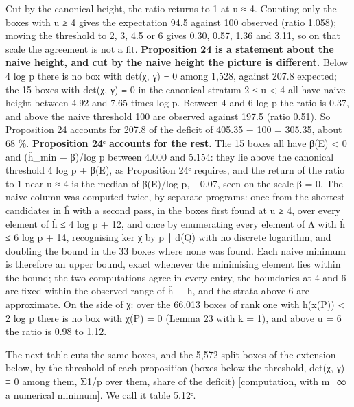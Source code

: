 \documentclass[11pt,a4paper]{article}
\theoremstyle{named}
\begin{document}
Cut by the canonical height, the ratio returns to 1 at u ≈ 4. Counting only the boxes with u ≥ 4 gives the expectation 94.5 against 100 observed (ratio 1.058); moving the threshold to 2, 3, 4.5 or 6 gives 0.30, 0.57, 1.36 and 3.11, so on that scale the agreement is not a fit. \textbf{Proposition 24 is a statement about the naive height, and cut by the naive height the picture is different.} Below 4 log p there is no box with det(χ, γ) ≡ 0 among 1,528, against 207.8 expected; the 15 boxes with det(χ, γ) ≡ 0 in the canonical stratum 2 ≤ u \textless{} 4 all have naive height between 4.92 and 7.65 times log p. Between 4 and 6 log p the ratio is 0.37, and above the naive threshold 100 are observed against 197.5 (ratio 0.51). So Proposition 24 accounts for 207.8 of the deficit of 405.35 − 100 = 305.35, about 68 \%. \textbf{Proposition 24ᶜ accounts for the rest.} The 15 boxes all have β(E) \textless{} 0 and (ĥ\_min − β)/log p between 4.000 and 5.154: they lie above the canonical threshold 4 log p + β(E), as Proposition 24ᶜ requires, and the return of the ratio to 1 near u ≈ 4 is the median of β(E)/log p, −0.07, seen on the scale β = 0. The naive column was computed twice, by separate programs: once from the shortest candidates in ĥ with a second pass, in the boxes first found at u ≥ 4, over every element of ĥ ≤ 4 log p + 12, and once by enumerating every element of Λ with ĥ ≤ 6 log p + 14, recognising ker χ by p ∣ d(Q) with no discrete logarithm, and doubling the bound in the 33 boxes where none was found. Each naive minimum is therefore an upper bound, exact whenever the minimising element lies within the bound; the two computations agree in every entry, the boundaries at 4 and 6 are fixed within the observed range of ĥ − h, and the strata above 6 are approximate. On the side of χ: over the 66,013 boxes of rank one with h(x(P)) \textless{} 2 log p there is no box with χ(P) = 0 (Lemma 23 with k = 1), and above u = 6 the ratio is 0.98 to 1.12.

The next table cuts the same boxes, and the 5,572 split boxes of the extension below, by the threshold of each proposition (boxes below the threshold, det(χ, γ) ≡ 0 among them, Σ1/p over them, share of the deficit) [computation, with m\_∞ a numerical minimum]. We call it table 5.12ᶜ.
\end{document}
